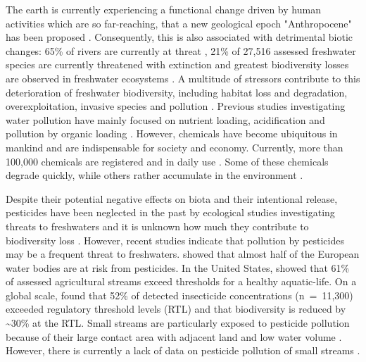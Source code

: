 The earth is currently experiencing a functional change driven by human activities which are so far-reaching, that a new geological epoch "Anthropocene" has been proposed \citep{crutzen_geology_2002, steffen_anthropocene:global_2011, waters_anthropocene_2016}. 
Consequently, this is also associated with detrimental biotic changes: 65\% of rivers are currently at threat \citep{vorosmarty_global_2010}, 21\% of 27,516 assessed freshwater species are currently threatened with extinction \citep{iucn_iucn_2016} and greatest biodiversity losses are observed in freshwater ecosystems \citep{wwf_living_2016}. 
A multitude of stressors contribute to this deterioration of freshwater biodiversity, including habitat loss and degradation, overexploitation, invasive species and pollution \citep{dudgeon_freshwater_2006, vorosmarty_global_2010, wwf_living_2016, collen_global_2014}. 
Previous studies investigating water pollution have mainly focused on nutrient loading, acidification and pollution by organic loading \citep{schafer_contribution_2016}. 
However, chemicals have become ubiquitous in mankind and are indispensable for society and economy. 
Currently, more than 100,000 chemicals are registered and in daily use \citep{schwarzman_new_2009, schwarzenbach_global_2010}.
Some of these chemicals degrade quickly, while others rather accumulate in the environment \citep{fenner_evaluating_2013}.

Despite their potential negative effects on biota and their intentional release, pesticides have been neglected in the past by ecological studies investigating threats to freshwaters \citep{schafer_contribution_2016} and it is unknown how much they contribute to biodiversity loss \citep{rockstrom_safe_2009, persson_confronting_2013}. 
However, recent studies indicate that pollution by pesticides may be a frequent threat to freshwaters.
\citet{malaj_organic_2014} showed that almost half of the European water bodies are at risk from pesticides. 
In the United States, \citet{stone_pesticides_2014} showed that 61\% of assessed agricultural streams exceed thresholds for a healthy aquatic-life.
On a global scale, \citet{stehle_pesticide_2015} found that 52\% of detected insecticide concentrations (n~=~11,300) exceeded regulatory threshold levels (RTL) and that biodiversity is reduced by \textasciitilde30\% at the RTL.
Small streams are particularly exposed to pesticide pollution because of their large contact area with adjacent land and low water volume \citep{biggs_importance_2016}.
However, there is currently a lack of data on pesticide pollution of small streams \citep{lorenz_specifics_2016}. 

